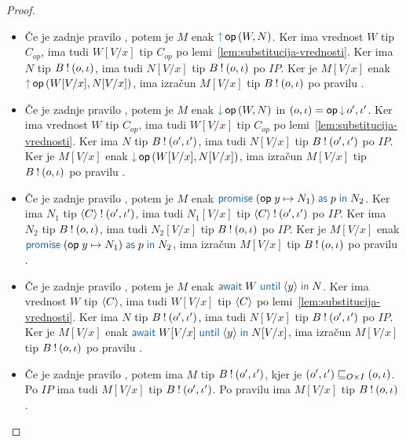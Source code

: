 \begin{proof}
\begin{itemize}
		\item Če je zadnje pravilo , potem je $M$ enak $\tmopout{op}{W}{N}$.
		Ker ima vrednost $W$ tip $C_{op}$, ima tudi $W[V/x]$ tip $C_{op}$ po lemi~\ref{lem:substitucija-vrednosti}.
		Ker ima $N$ tip $B \mathbin{!} (o, \iota)$, ima tudi $N[V/x]$ tip $B \mathbin{!} (o, \iota)$ po $IP$.
		Ker je $M[V/x]$ enak $\tmopout{op}{W[V/x]}{N[V/x]}$, ima izračun $M[V/x]$ tip $B \mathbin{!} (o, \iota)$ po pravilu .
		
		\item Če je zadnje pravilo , potem je $M$ enak $\tmopin{op}{W}{N}$ in $(\o, \i) = \opincomp{op}{\o', \i'}$.
		Ker ima vrednost $W$ tip $C_{op}$, ima tudi $W[V/x]$ tip $C_{op}$ po lemi~\ref{lem:substitucija-vrednosti}.
		Ker ima $N$ tip $B \mathbin{!} (o', \iota')$, ima tudi $N[V/x]$ tip $B \mathbin{!} (o', \iota')$ po $IP$.
		Ker je $M[V/x]$ enak $\tmopin{op}{W[V/x]}{N[V/x]}$, ima izračun $M[V/x]$ tip $B \mathbin{!} (o, \iota)$ po pravilu .
		
		\item Če je zadnje pravilo , potem je $M$ enak $\tmwith{op}{y}{N_1}{p}{N_2}$.
		Ker ima $N_1$ tip $\langle C \rangle \mathbin{!} (o', \iota')$, ima tudi $N_1[V/x]$ tip $\langle C \rangle \mathbin{!} (o', \iota')$ po $IP$.
		Ker ima $N_2$ tip $B \mathbin{!} (o, \iota)$, ima tudi $N_2[V/x]$ tip $B \mathbin{!} (o, \iota)$ po $IP$.
		Ker je $M[V/x]$ enak $\tmwith{op}{y}{N_1}{p}{N_2}$, ima izračun $M[V/x]$ tip $B \mathbin{!} (o, \iota)$ po pravilu .
		
		\item Če je zadnje pravilo , potem je $M$ enak $\tmawait{W}{y}{N}$.
		Ker ima vrednost $W$ tip $\langle C \rangle$, ima tudi $W[V/x]$ tip $\langle C \rangle$ po lemi~\ref{lem:substitucija-vrednosti}.
		Ker ima $N$ tip $B \mathbin{!} (o', \iota')$, ima tudi $N[V/x]$ tip $B \mathbin{!} (o', \iota')$ po $IP$.
		Ker je $M[V/x]$ enak $\tmawait{W[V/x]}{y}{N[V/x]}$, ima izračun $M[V/x]$ tip $B \mathbin{!} (o, \iota)$ po pravilu .
		
		\item Če je zadnje pravilo , potem ima $M$ tip $B \mathbin{!} (o', \iota')$, kjer je $(o', \iota') \sqsubseteq_{O \times I} (o, \iota)$.
		Po $IP$ ima tudi $M[V/x]$ tip $B \mathbin{!} (o', \iota')$. Po pravilu  ima $M[V/x]$ tip $B \mathbin{!} (o, \iota)$.
		
	\end{itemize}

\end{proof}

